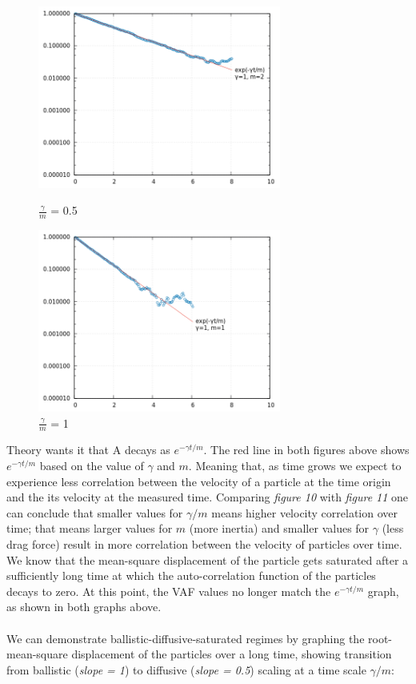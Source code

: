 \documentclass[a4paper,11pt]{article}
\begin{document}
\begin{figure}[!htb]
    \centering
    \begin{minipage}{.5\textwidth}
      \centering
      \includegraphics[width=8cm, height=6cm]{ac1.png}
      \caption{\(\frac{\gamma}{m}\) = 0.5}
    \end{minipage}%
    \begin{minipage}{.5\textwidth}
      \centering
      \includegraphics[width=8cm, height=6cm]{ac2.png}
      \caption{\(\frac{\gamma}{m}\) = 1}
    \end{minipage}
\end{figure}
Theory wants it that A decays as \(e^{-\gamma t/m}\). The red line in both figures above shows \(e^{-\gamma t/m}\) based on the value of \(\gamma\) and \(m\). Meaning that, as time grows we expect to experience less correlation between the velocity of a particle at the time origin and the its velocity at the measured time. Comparing \emph{figure 10} with \emph{figure 11} one can conclude that smaller values for \(\gamma/m\) means higher velocity correlation over time; that means larger values for \(m\) (more inertia) and smaller values for \(\gamma\) (less drag force) result in more correlation between the velocity of particles over time. \\
We know that the mean-square displacement of the particle gets saturated after a sufficiently long time at which the auto-correlation function of the particles decays to zero. At this point, the VAF values no longer match the \(e^{-\gamma t/m}\) graph, as shown in both graphs above. \\\\
We can demonstrate ballistic-diffusive-saturated regimes by graphing the root-mean-square displacement of the particles over a long time, showing transition from ballistic (\emph{slope = 1}) to diffusive (\emph{slope = 0.5}) scaling at a time scale \(\gamma/m\):
\end{document}
